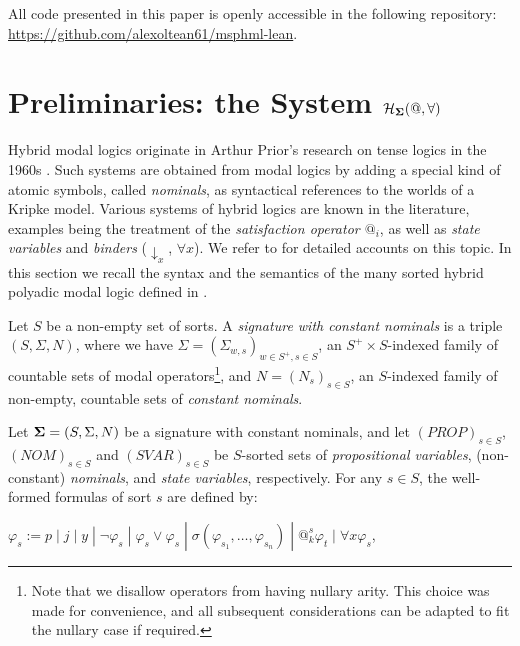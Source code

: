 \documentclass{easychair}
\theoremstyle{remark}
\begin{document}
All code presented in this paper is openly accessible in the following repository: \url{https://github.com/alexoltean61/msphml-lean}.

\section{Preliminaries: the System $\mathcal{H}_{\bf \Sigma}(@, \forall)$}\label{prel}

Hybrid modal logics originate in Arthur Prior's research on tense logics in the 1960s \cite{whatarehybrid}. Such systems are obtained from modal logics by adding a special kind of atomic symbols, called \textit{nominals}, as  syntactical references to the worlds of a Kripke model. Various systems of hybrid logics are known in the literature, examples being the treatment of the \textit{satisfaction operator $@_i$}, as well as \textit{state variables} and \textit{binders} ($\downarrow_x$, $\forall x$). We refer to \cite{whatarehybrid,handbook} for detailed accounts on this topic. In this section we recall the syntax and the semantics of the many sorted hybrid polyadic modal logic defined in \cite{tableaux}.

Let $S$ be a non-empty set of sorts. A \textit{signature with constant nominals} is a triple $(S, \Sigma, N)$, where we have $\Sigma = (\Sigma_{w,s})_{w \in S^+, s \in S}$, an $S^+\times S$-indexed family of countable sets of modal operators\footnote{Note that we disallow operators from having nullary arity. This choice was made for convenience, and all subsequent considerations can be adapted to fit the nullary case if required.}, and  $N = (N_s)_{s \in S}$, an $S$-indexed family of non-empty, countable sets of \textit{constant nominals}. 
   

Let ${\bf \Sigma} = (S, \Sigma, N)$ be a signature with constant nominals, and let $(PROP)_{s \in S}$, $(NOM)_{s \in S}$ and $(SVAR)_{s \in S}$ be $S$-sorted sets of \textit{propositional variables}, (non-constant) \textit{nominals}, and \textit{state variables}, respectively. For any $s\in S$, the well-formed formulas of sort $s$  are defined by:
   
        $\varphi_s := p \; | \; j \; | \; y \; | \; \neg \varphi_s \; | \; \varphi_s \lor \varphi_s \; | \; \sigma(\varphi_{s_1}, \dots, \varphi_{s_n}) \; | \; @_k^s \varphi_t \; | \; \forall x \varphi_s$,
   
\end{document}

